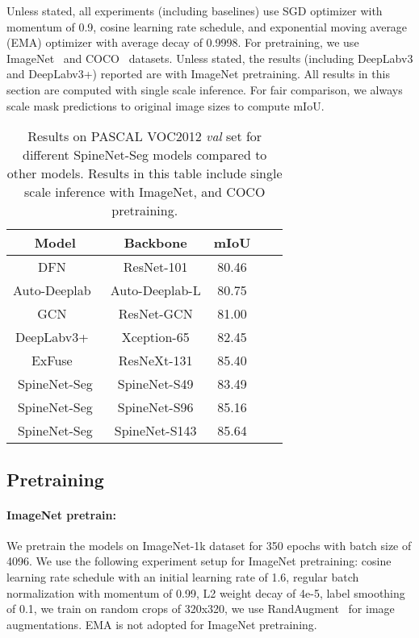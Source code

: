 \documentclass[10pt,twocolumn,letterpaper]{article}
\begin{document}
Unless stated, all experiments (including baselines) use SGD optimizer with momentum of 0.9, cosine learning rate schedule, and exponential moving average (EMA) optimizer with average decay of 0.9998. For pretraining, we use ImageNet~\cite{deng09imagenet} and COCO~\cite{coco} datasets. Unless stated, the results (including DeepLabv3 and DeepLabv3+) reported are with ImageNet pretraining. All results in this section are computed with single scale inference. For fair comparison, we always scale mask predictions to original image sizes to compute mIoU.

\setlength{\tabcolsep}{4pt}
\begin{table}[h!]
\centering
\begin{tabular}{c | c | c  c | c}
  \toprule
  Model & Backbone & mIoU  \\
  \midrule
  DFN~\cite{yu2018learning} & ResNet-101 & 80.46 \\
  Auto-Deeplab~\cite{autodeeplab} & Auto-Deeplab-L & 80.75 \\
  GCN~\cite{peng2017large} & ResNet-GCN & 81.00 \\
  DeepLabv3+~\cite{deeplabv3plus} & Xception-65 & 82.45\\
  ExFuse~\cite{zhang2018exfuse} & ResNeXt-131 & 85.40 \\
  \midrule
  SpineNet-Seg & SpineNet-S49 & 83.49 \\
  SpineNet-Seg & SpineNet-S96 & 85.16 \\
  SpineNet-Seg & SpineNet-S143 & 85.64 \\
  \bottomrule
\end{tabular}
\caption{Results on PASCAL VOC2012 \textit{val} set for different SpineNet-Seg models compared to other models. Results in this table include single scale inference with ImageNet, and COCO pretraining.}
\label{tab:pascal_model_scale} 
\end{table}


\subsection{Pretraining}
\paragraph{ImageNet pretrain:}
We pretrain the models on ImageNet-1k dataset for 350 epochs with batch size of 4096. We use the following experiment setup for ImageNet pretraining:  cosine learning rate schedule with an initial learning rate of 1.6, regular batch normalization with momentum of 0.99, L2 weight decay of 4e-5, label smoothing of 0.1, we train on random crops of 320x320, we use RandAugment~\cite{randaug} for image augmentations. EMA is not adopted for ImageNet pretraining.
\end{document}
